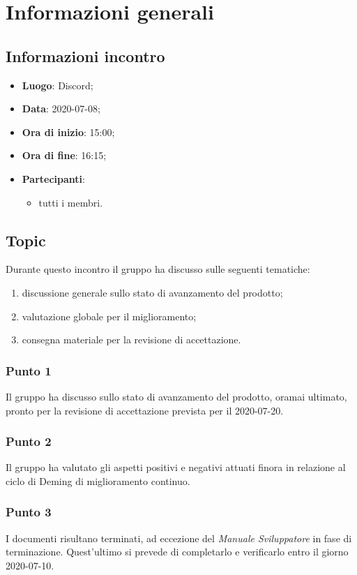 \section{Informazioni generali}
\subsection{Informazioni incontro}
\begin{itemize}
\item \textbf{Luogo}: Discord;
\item \textbf{Data}: 2020-07-08;
\item \textbf{Ora di inizio}: 15:00;
\item \textbf{Ora di fine}: 16:15;
\item \textbf{Partecipanti}:
	\begin{itemize}
		\item tutti i membri.
	\end{itemize}
\end{itemize}

\subsection{Topic}
Durante questo incontro il gruppo ha discusso sulle seguenti tematiche:
\begin{enumerate}
\item discussione generale sullo stato di avanzamento del prodotto;
\item valutazione globale per il miglioramento;
\item consegna materiale per la revisione di accettazione.
\end{enumerate}

\subsubsection{Punto 1}
Il gruppo ha discusso sullo stato di avanzamento del prodotto, oramai ultimato, pronto per la revisione di accettazione prevista per il 2020-07-20.

\subsubsection{Punto 2}
Il gruppo ha valutato gli aspetti positivi e negativi attuati finora in relazione al ciclo di Deming di miglioramento continuo.

\subsubsection{Punto 3}
I documenti risultano terminati, ad eccezione del \textit{Manuale Sviluppatore} in fase di terminazione. Quest'ultimo si prevede di completarlo e verificarlo entro il giorno 2020-07-10.

